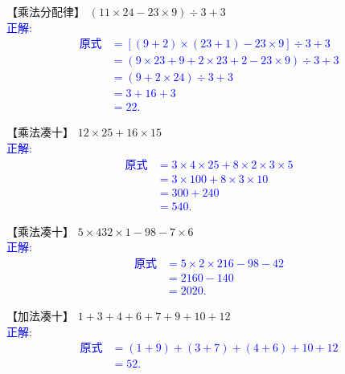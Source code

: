 \item {
    【乘法分配律】
    $(11\times 24 - 23\times 9)\div 3 + 3$
    \ifshowSolution
        \\\fangsong{}\textcolor{blue}{
            正解:
            \begin{align*}
                \mbox{原式} &= [(9+2)\times (23+1) - 23\times 9]\div 3 + 3 \\
                &= (9\times 23 + 9 + 2\times 23 + 2 - 23\times 9)\div 3 + 3 \\
                &= (9 + 2\times 24)\div 3 + 3 \\
                &= 3 + 16 + 3 \\
                &= 22.
            \end{align*}
        }
    \else
        \vspace{1cm}
    \fi
}

\item {
    【乘法凑十】
    $12\times 25 + 16\times 15$
    \ifshowSolution
        \\\fangsong{}\textcolor{blue}{
            正解:
            \begin{align*}
                \mbox{原式} &= 3\times 4\times 25 + 8\times 2 \times 3\times 5 \\
                &= 3\times 100 + 8\times 3\times 10 \\
                &= 300 + 240 \\
                &= 540.
            \end{align*}
        }
    \else
        \vspace{1cm}
    \fi
}

\item {
    【乘法凑十】
    $5\times 432\times 1 - 98 - 7\times 6$
    \ifshowSolution
        \\\fangsong{}\textcolor{blue}{
            正解:
            \begin{align*}
                \mbox{原式} &= 5\times 2\times 216 - 98 - 42 \\
                &= 2160 - 140 \\
                &= 2020.
            \end{align*}
        }
    \else
        \vspace{1cm}
    \fi
}

\item {
    【加法凑十】
    $1+3+4+6+7+9+10 + 12$
    \ifshowSolution
        \\\fangsong{}\textcolor{blue}{
            正解:
            \begin{align*}
                \mbox{原式} &= (1+9) + (3+7) + (4+6) +10 + 12 \\
                &= 52.
            \end{align*}
        }
    \else
        \vspace{1cm}
    \fi
}

